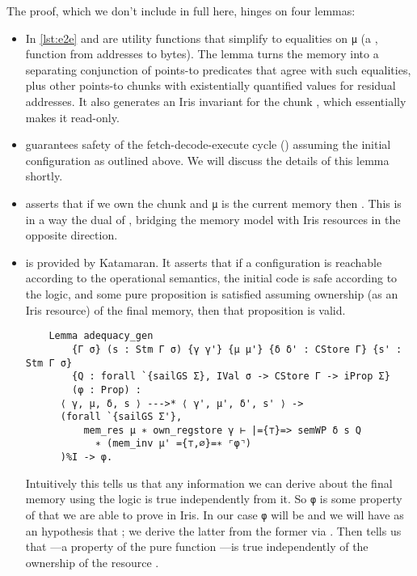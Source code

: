 The proof, which we don't include in full here, hinges on four lemmas:
\begin{itemize}
\item In \cref{lst:e2e}  and  are utility functions that simplify to equalities on \texttt{\small μ} (a , \ie function from addresses to bytes). The  lemma turns the memory into a separating conjunction of points-to predicates that agree with such equalities, plus other points-to chunks with existentially quantified values for residual addresses. It also generates an Iris invariant for the chunk , which essentially makes it read-only.
\item {} guarantees safety of the fetch-decode-execute cycle (\ie {}) assuming the initial configuration as outlined above. We will discuss the details of this lemma shortly.
\item {} asserts that if we own the chunk  and \texttt{\small μ} is the current memory then . This is in a way the dual of , bridging the memory model with Iris resources in the opposite direction.
\item {} is provided by Katamaran. It  asserts that if a configuration is reachable according to the operational semantics, the initial code is safe according to the logic, and some pure proposition is satisfied assuming ownership (as an Iris resource) of the final memory, then that proposition is valid.

  \begin{verbatim}
    Lemma adequacy_gen
        {Γ σ} (s : Stm Γ σ) {γ γ'} {μ μ'} {δ δ' : CStore Γ} {s' : Stm Γ σ}
        {Q : forall `{sailGS Σ}, IVal σ -> CStore Γ -> iProp Σ}
        (φ : Prop) :
      ⟨ γ, μ, δ, s ⟩ --->* ⟨ γ', μ', δ', s' ⟩ ->
      (forall `{sailGS Σ'},
          mem_res μ ∗ own_regstore γ ⊢ |={⊤}=> semWP δ s Q
            ∗ (mem_inv μ' ={⊤,∅}=∗ ⌜φ⌝)
      )%I -> φ.
  \end{verbatim}

  Intuitively this tells us that any information we can derive about the final memory using the logic is true independently from it. So \texttt{\small φ} is some property of  that we are able to prove in Iris. In our case \texttt{\small φ} will be  and we will have as an hypothesis that ; we derive the latter from the former via . Then  tells us that ---a property of the pure function ---is true independently of the ownership of the resource .
\end{itemize}
